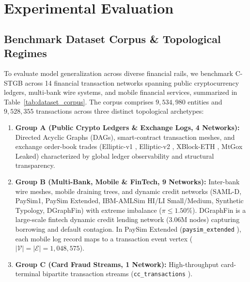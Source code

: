\section{Experimental Evaluation}
\label{sec:experiments}

\subsection{Benchmark Dataset Corpus \& Topological Regimes}
\label{sec:dataset_corpus}
To evaluate model generalization across diverse financial rails, we benchmark C-STGB across 14 financial transaction networks spanning public cryptocurrency ledgers, multi-bank wire systems, and mobile financial services, summarized in Table~\ref{tab:dataset_corpus}. The corpus comprises $9,534,980$ entities and $9,528,355$ transactions across three distinct topological archetypes:
\begin{enumerate}
    \item \textbf{Group A (Public Crypto Ledgers \& Exchange Logs, 4 Networks):} Directed Acyclic Graphs (DAGs), smart-contract transaction meshes, and exchange order-book trades (Elliptic-v1 \citep{weber2019anti}, Elliptic-v2 \citep{bellei2024elliptic2}, XBlock-ETH \citep{zheng2020xblock}, MtGox Leaked) characterized by global ledger observability and structural transparency.
    \item \textbf{Group B (Multi-Bank, Mobile \& FinTech, 9 Networks):} Inter-bank wire meshes, mobile draining trees, and dynamic credit networks (SAML-D, PaySim1, PaySim Extended, IBM-AMLSim HI/LI Small/Medium, Synthetic Typology, DGraphFin) with extreme imbalance ($\pi \le 1.50\%$). DGraphFin is a large-scale fintech dynamic credit lending network ($3.06\text{M}$ nodes) capturing borrowing and default contagion. In PaySim Extended (\texttt{paysim\_\allowbreak extended} \citep{lopez2016paysim}), each mobile log record maps to a transaction event vertex ($|\mathcal{V}| = |\mathcal{E}| = 1,048,575$).
    \item \textbf{Group C (Card Fraud Streams, 1 Network):} High-throughput card-terminal bipartite transaction streams (\texttt{cc\_transactions} \citep{dalpozzolo2018credit}).
\end{enumerate}

